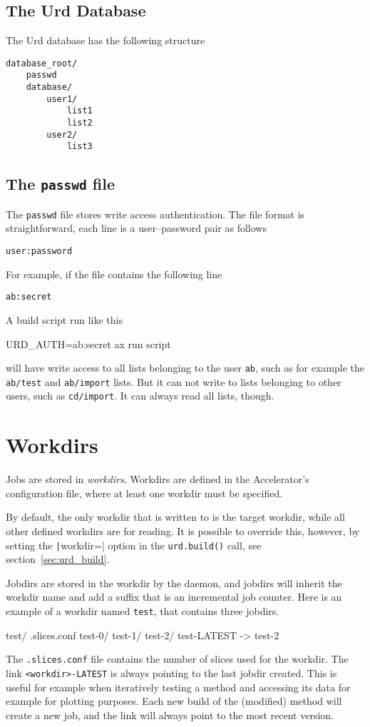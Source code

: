 \subsection{The Urd Database}
The Urd database has the following structure
\begin{verbatim}
database_root/
    passwd
    database/
        user1/
            list1
            list2
        user2/
            list3
\end{verbatim}



\subsection{The \texttt{passwd} file}
The \texttt{passwd} file stores write access authentication.  The file
format is straightforward, each line is a user--password pair as follows
\begin{verbatim}
user:password
\end{verbatim}
For example, if the file contains the following line
\begin{verbatim}
ab:secret
\end{verbatim}
A build script run like this
\begin{shell}
URD_AUTH=ab:secret ax run script
\end{shell}
will have write access to all lists belonging to the user \texttt{ab},
such as for example the \texttt{ab/test} and \texttt{ab/import} lists.
But it can not write to lists belonging to other users, such as
\texttt{cd/import}.  It can always read all lists, though.



\section{Workdirs}
Jobs are stored in \textsl{workdirs}.  Workdirs are defined in the
Accelerator's configuration file, where at least one workdir must be
specified.

By default, the only workdir that is written to is the target workdir,
while all other defined workdirs are for reading.  It is possible to
override this, however, by setting the \texttt|workdir=|
option in the \texttt{urd.build()} call, see
section~\ref{sec:urd_build}.

Jobdirs are stored in the workdir by the daemon, and jobdirs will
inherit the workdir name and add a suffix that is an incremental job
counter.  Here is an example of a workdir named \texttt{test}, that
contains three jobdirs.
\begin{shell}
test/
    .slices.conf
    test-0/
    test-1/
    test-2/
    test-LATEST -> test-2
\end{shell}
The \texttt{.slices.conf} file contains the number of slices used for
the workdir.  The link \texttt{<workdir>-LATEST} is always pointing to
the last jobdir created.  This is useful for example when iteratively
testing a method and accessing its data for example for plotting
purposes.  Each new build of the (modified) method will create a new
job, and the link will always point to the most recent
version.


